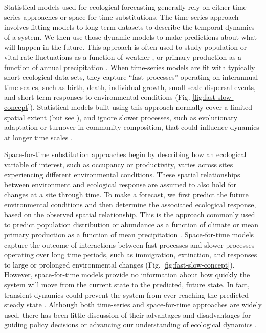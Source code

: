 \documentclass[11pt]{article}
\begin{document}
Statistical models used for ecological forecasting generally rely on either time-series approaches or space-for-time substitutions. The time-series approach involves fitting models to long-term datasets to describe the temporal dynamics of a system.  We then use those dynamic models to make predictions about what will happen in the future. This approach is often used to study population or vital rate fluctuations as a function of weather \citep{dalgleish_climate_2011}, or primary production as a function of annual precipitation \citep{lauenroth_long-term_1992}. When time-series models are fit with typically short ecological data sets, they capture ``fast processes'' operating on interannual time-scales, such as birth, death, individual growth, small-scale dispersal events, and short-term responses to environmental conditions (Fig. \ref{fig:fast-slow-concept}). Statistical models built using this approach normally cover a limited spatial extent (but see \citealt{Hefley2017,kleinhesselink_response_2018,Chevalier}), and ignore slower processes, such as evolutionary adaptation or turnover in community composition, that could influence dynamics at longer time scales \citep{clark_ecological_2001}. 

Space-for-time substitution approaches begin by describing how an ecological variable of interest, such as occupancy or productivity,  varies across sites experiencing different environmental conditions. These spatial relationships between environment and ecological response are assumed to also hold for changes at a site through time. To make a forecast, we first predict the future environmental conditions and then determine the associated ecological response, based on the observed spatial relationship.  This is the approach commonly used to predict population distribution or abundance as a function of climate \citep{elith_species_2009} or mean primary production as a function of mean precipitation \citep{Sala1988}. Space-for-time models capture the outcome of interactions between fast processes and slower processes operating over long time periods, such as immigration, extinction, and responses to large or prolonged environmental changes (Fig. \ref{fig:fast-slow-concept}). However, space-for-time models provide no information about how quickly the system will move from the current state to the predicted, future state. In fact, transient dynamics could prevent the system from ever reaching the predicted steady state \citep{Urban2012}. Although both time-series and space-for-time approaches are widely used, there has been little discussion of their advantages and disadvantages for guiding policy decisions or advancing our understanding of ecological dynamics \citep{harris_forecasting_2018,Renwick2018}. 
\end{document}
